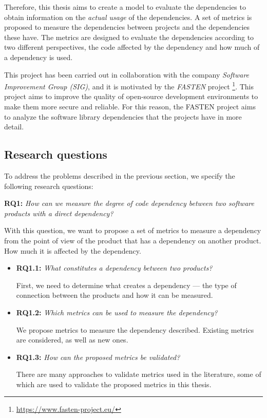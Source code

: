 \blankl
Therefore, this thesis aims to create a model to evaluate the dependencies to obtain information on the \textit{actual usage} of the dependencies. A set of metrics is proposed to measure the dependencies between projects and the dependencies these have. The metrics are designed to evaluate the dependencies according to two different perspectives, the code affected by the dependency and how much of a dependency is used.

This project has been carried out in collaboration with the company \textit{Software Improvement Group (SIG)}, and it is motivated by the \textit{FASTEN} project \footnote{\url{https://www.fasten-project.eu/}}. This project aims to improve the quality of open-source development environments to make them more secure and reliable. For this reason, the FASTEN project aims to analyze the software library dependencies that the projects have in more detail.

\subsection{Research questions}
To address the problems described in the previous section, we specify the following research questions:

\blankl
\textbf{RQ1:} \textit{How can we measure the degree of code dependency between two software products with a direct dependency?}

\blankls
With this question, we want to propose a set of metrics to measure a dependency from the point of view of the product that has a dependency on another product. How much it is affected by the dependency.

\begin{itemize}
  \item \textbf{RQ1.1:} \textit{What constitutes a dependency between two products?}

  First, we need to determine what creates a dependency — the type of connection between the products and how it can be measured.

  \item \textbf{RQ1.2:} \textit{Which metrics can be used to measure the dependency?}

  We propose metrics to measure the dependency described. Existing metrics are considered, as well as new ones.

  \item \textbf{RQ1.3:} \textit{How can the proposed metrics be validated?}

  There are many approaches to validate metrics used in the literature, some of which are used to validate the proposed metrics in this thesis.
\end{itemize}

